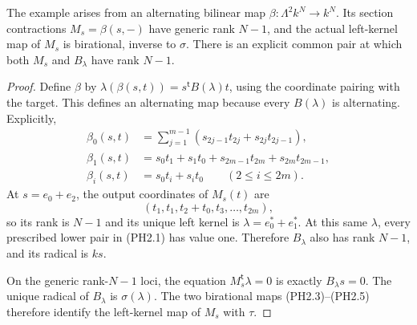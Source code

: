 \begin{corollary}
\label{cor:abstract-Pfaffian-common-incidence}
The example arises from an alternating bilinear map
\(\beta:\Lambda^2k^N\to k^N\).  Its section contractions
\(M_s=\beta(s,-)\) have generic rank \(N-1\), and the actual
left-kernel map of \(M_s\) is birational, inverse to \(\sigma\).
There is an explicit common pair at which both \(M_s\) and
\(B_\lambda\) have rank \(N-1\).
\end{corollary}
\begin{proof}
Define \(\beta\) by
\(\lambda(\beta(s,t))=s^{\mathsf t}B(\lambda)t\), using the
coordinate pairing with the target.  This defines an alternating
map because every \(B(\lambda)\) is alternating.  Explicitly,
\[
 \begin{aligned}
 \beta_0(s,t)&=\sum_{j=1}^{m-1}
       (s_{2j-1}t_{2j}+s_{2j}t_{2j-1}),\\
 \beta_1(s,t)&=s_0t_1+s_1t_0+
       s_{2m-1}t_{2m}+s_{2m}t_{2m-1},\\
 \beta_i(s,t)&=s_0t_i+s_it_0\qquad(2\le i\le2m).
 \end{aligned}                                                   \tag{PH2.7}
\]
At \(s=e_0+e_2\), the output coordinates of \(M_s(t)\) are
\[
              (t_1,t_1,t_2+t_0,t_3,\ldots,t_{2m}),               \tag{PH2.8}
\]
so its rank is \(N-1\) and its unique left kernel is
\(\lambda=e_0^*+e_1^*\).  At this same \(\lambda\), every
prescribed lower pair in (PH2.1) has value one.  Therefore
\(B_\lambda\) also has rank \(N-1\), and its radical is \(ks\).

On the generic rank-\(N-1\) loci, the equation
\(M_s^{\mathsf t}\lambda=0\) is exactly \(B_\lambda s=0\).
The unique radical of \(B_\lambda\) is \(\sigma(\lambda)\).
The two birational maps (PH2.3)--(PH2.5) therefore identify
the left-kernel map of \(M_s\) with \(\tau\).
\end{proof}

